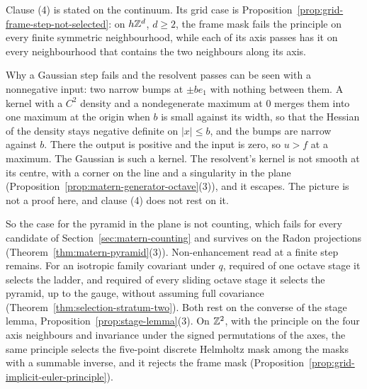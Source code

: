Clause (4) is stated on the continuum. Its grid case is
Proposition~\ref{prop:grid-frame-step-not-selected}: on $h\mathbb{Z}^d$, $d \ge 2$, the frame mask fails the
principle on every finite symmetric neighbourhood, while each of its axis passes has it on every
neighbourhood that contains the two neighbours along its axis.

Why a Gaussian step fails and the resolvent passes can be seen with a nonnegative input: two narrow
bumps at $\pm be_1$ with nothing between them. A kernel with a $C^2$ density and a nondegenerate
maximum at $0$ merges them into one maximum at the origin when $b$ is small against its width, so
that the Hessian of the density stays negative definite on $|x| \le b$, and the bumps are narrow
against $b$. There the output is positive and the input is zero, so $u > f$ at a maximum. The
Gaussian is such a kernel. The resolvent's kernel is not smooth at its centre, with a corner on the
line and a singularity in the plane (Proposition~\ref{prop:matern-generator-octave}(3)), and it
escapes. The picture is not a proof here, and clause (4) does not rest on it.

So the case for the \Matern{} pyramid in the plane is not counting, which fails for every candidate
of Section~\ref{sec:matern-counting} and survives on the Radon projections
(Theorem~\ref{thm:matern-pyramid}(3)). Non-enhancement read at a finite step remains. For an
isotropic family covariant under $q$, required of one octave stage it selects the ladder, and required of
every sliding octave stage it selects the \Matern{} pyramid, up to the gauge, without assuming full
covariance (Theorem~\ref{thm:selection-stratum-two}). Both rest on the converse of the stage lemma,
Proposition~\ref{prop:stage-lemma}(3). On $\mathbb{Z}^2$, with the principle on the four axis neighbours
and invariance under the signed permutations of the axes, the same principle selects the five-point
discrete Helmholtz mask among the masks with a summable inverse, and it rejects the frame mask
(Proposition~\ref{prop:grid-implicit-euler-principle}).

